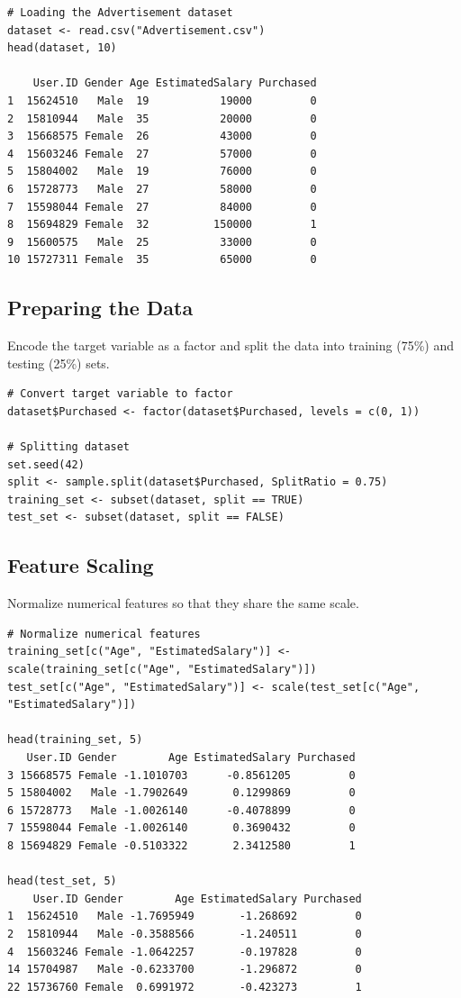 \documentclass{article}
\begin{document}
\begin{verbatim}
# Loading the Advertisement dataset
dataset <- read.csv("Advertisement.csv")
head(dataset, 10)

    User.ID Gender Age EstimatedSalary Purchased
1  15624510   Male  19           19000         0
2  15810944   Male  35           20000         0
3  15668575 Female  26           43000         0
4  15603246 Female  27           57000         0
5  15804002   Male  19           76000         0
6  15728773   Male  27           58000         0
7  15598044 Female  27           84000         0
8  15694829 Female  32          150000         1
9  15600575   Male  25           33000         0
10 15727311 Female  35           65000         0
\end{verbatim}

\subsection{Preparing the Data}
Encode the target variable as a factor and split the data into training (75\%) and testing (25\%) sets.

\begin{verbatim}
# Convert target variable to factor
dataset$Purchased <- factor(dataset$Purchased, levels = c(0, 1))

# Splitting dataset
set.seed(42)
split <- sample.split(dataset$Purchased, SplitRatio = 0.75)
training_set <- subset(dataset, split == TRUE)
test_set <- subset(dataset, split == FALSE)
\end{verbatim}

\subsection{Feature Scaling}
Normalize numerical features so that they share the same scale.

\begin{verbatim}
# Normalize numerical features
training_set[c("Age", "EstimatedSalary")] <- scale(training_set[c("Age", "EstimatedSalary")])
test_set[c("Age", "EstimatedSalary")] <- scale(test_set[c("Age", "EstimatedSalary")])

head(training_set, 5)
   User.ID Gender        Age EstimatedSalary Purchased
3 15668575 Female -1.1010703      -0.8561205         0
5 15804002   Male -1.7902649       0.1299869         0
6 15728773   Male -1.0026140      -0.4078899         0
7 15598044 Female -1.0026140       0.3690432         0
8 15694829 Female -0.5103322       2.3412580         1

head(test_set, 5)
    User.ID Gender        Age EstimatedSalary Purchased
1  15624510   Male -1.7695949       -1.268692         0
2  15810944   Male -0.3588566       -1.240511         0
4  15603246 Female -1.0642257       -0.197828         0
14 15704987   Male -0.6233700       -1.296872         0
22 15736760 Female  0.6991972       -0.423273         1
\end{verbatim}
\end{document}
